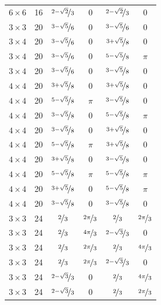 \documentclass{article}
\begin{document}
\begin{longtable}{cccccc}
$6 \times 6$ & 16 & $\nicefrac{2-\sqrt{2}}{3}$ & 0 & $\nicefrac{2-\sqrt{2}}{3}$ & 0 \\
$3 \times 3$ & 20 & $\nicefrac{3-\sqrt{5}}{6}$ & 0 & $\nicefrac{3-\sqrt{5}}{6}$ & 0 \\
$3 \times 4$ & 20 & $\nicefrac{3-\sqrt{5}}{6}$ & 0 & $\nicefrac{3+\sqrt{5}}{8}$ & 0 \\
$3 \times 4$ & 20 & $\nicefrac{3-\sqrt{5}}{6}$ & 0 & $\nicefrac{5-\sqrt{5}}{8}$ & $\pi$ \\
$3 \times 4$ & 20 & $\nicefrac{3-\sqrt{5}}{6}$ & 0 & $\nicefrac{3-\sqrt{5}}{8}$ & 0 \\
$4 \times 4$ & 20 & $\nicefrac{3+\sqrt{5}}{8}$ & 0 & $\nicefrac{3+\sqrt{5}}{8}$ & 0 \\
$4 \times 4$ & 20 & $\nicefrac{5-\sqrt{5}}{8}$ & $\pi$ & $\nicefrac{3-\sqrt{5}}{8}$ & 0 \\
$4 \times 4$ & 20 & $\nicefrac{3-\sqrt{5}}{8}$ & 0 & $\nicefrac{5-\sqrt{5}}{8}$ & $\pi$ \\
$4 \times 4$ & 20 & $\nicefrac{3-\sqrt{5}}{8}$ & 0 & $\nicefrac{3+\sqrt{5}}{8}$ & 0 \\
$4 \times 4$ & 20 & $\nicefrac{5-\sqrt{5}}{8}$ & $\pi$ & $\nicefrac{3+\sqrt{5}}{8}$ & 0 \\
$4 \times 4$ & 20 & $\nicefrac{3+\sqrt{5}}{8}$ & 0 & $\nicefrac{3-\sqrt{5}}{8}$ & 0 \\
$4 \times 4$ & 20 & $\nicefrac{5-\sqrt{5}}{8}$ & $\pi$ & $\nicefrac{5-\sqrt{5}}{8}$ & $\pi$ \\
$4 \times 4$ & 20 & $\nicefrac{3+\sqrt{5}}{8}$ & 0 & $\nicefrac{5-\sqrt{5}}{8}$ & $\pi$ \\
$4 \times 4$ & 20 & $\nicefrac{3-\sqrt{5}}{8}$ & 0 & $\nicefrac{3-\sqrt{5}}{8}$ & 0 \\
$3 \times 3$ & 24 & $\nicefrac{2}{3}$ & $\nicefrac{2\pi}{3}$ & $\nicefrac{2}{3}$ & $\nicefrac{2\pi}{3}$ \\
$3 \times 3$ & 24 & $\nicefrac{2}{3}$ & $\nicefrac{4\pi}{3}$ & $\nicefrac{2-\sqrt{3}}{3}$ & 0 \\
$3 \times 3$ & 24 & $\nicefrac{2}{3}$ & $\nicefrac{2\pi}{3}$ & $\nicefrac{2}{3}$ & $\nicefrac{4\pi}{3}$ \\
$3 \times 3$ & 24 & $\nicefrac{2}{3}$ & $\nicefrac{2\pi}{3}$ & $\nicefrac{2-\sqrt{3}}{3}$ & 0 \\
$3 \times 3$ & 24 & $\nicefrac{2-\sqrt{3}}{3}$ & 0 & $\nicefrac{2}{3}$ & $\nicefrac{4\pi}{3}$ \\
$3 \times 3$ & 24 & $\nicefrac{2-\sqrt{3}}{3}$ & 0 & $\nicefrac{2}{3}$ & $\nicefrac{2\pi}{3}$ \\

\end{longtable}
\end{document}
